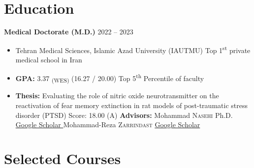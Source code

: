 \documentclass[letterpaper,11pt]{article} %
\begin{document}
\section{Education}
\textbf{Medical Doctorate (M.D.)} \hfill \footnotesize{2022 -- 2023} \normalsize
\vspace{-0.5\baselineskip}
\begin{itemize}
 \item Tehran Medical Sciences, Islamic Azad University (IAUTMU) \footnotesize Top 1\textsuperscript{st} private medical school in Iran \normalsize
 \item \textbf{GPA:} 3.37\textsubscript{ (WES)} \space \space (16.27 / 20.00) \space \space Top 5\textsuperscript{th} Percentile of faculty
 \item \textbf{Thesis:} Evaluating the role of nitric oxide neurotransmitter on the reactivation of fear memory extinction in rat models of post-traumatic stress disorder (PTSD) \hfill \footnotesize Score: 18.00 (A)  \normalsize
 \newline \footnotesize \textbf{Advisors:} Mohammad \textsc{Nasehi} Ph.D. \href{https://scholar.google.com/citations?hl=en\&user=fMArE4kAAAAJ}{Google Scholar \faExternalLink*}  \hfill  Mohammad-Reza  \textsc{Zarrindast} \href{https://scholar.google.com/citations?user=vuFnRv0AAAAJ\&hl=en\&oi=ao}{Google Scholar \faExternalLink*}
 \normalsize
\end{itemize}




\section{Selected Courses}
\footnotesize
\end{document}
